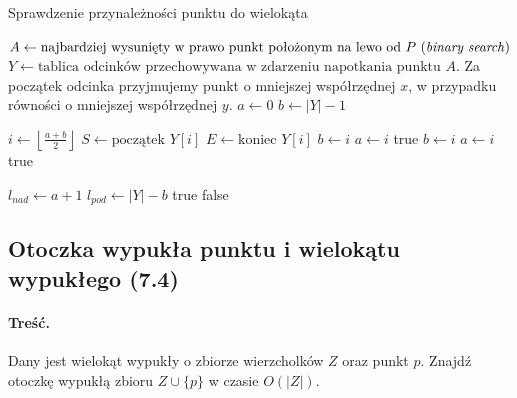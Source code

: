 \begin{algorithm}[H]
	\caption{Sprawdzenie przynależności punktu do wielokąta}
	\begin{algorithmic}[1]
			\State $A \gets \text{najbardziej wysunięty w prawo punkt położonym na lewo od $P$ (\textit{binary search})}$	
			\State $Y \gets \text{tablica odcinków przechowywana w zdarzeniu napotkania punktu $A$. }$Za początek odcinka przyjmujemy punkt o mniejszej współrzędnej $x$, w przypadku równości o mniejszej współrzędnej $y$.
			\State $a \gets 0$
			\State $b \gets |Y|-1$
			\State 
			
				\State $i \gets \left\lfloor \frac{a+b}{2} \right\rfloor$
				\State $S \gets \text{początek } Y[i]$ 
				\State $E \gets \text{koniec } Y[i]$ 
				 
					\State $b \gets i$
				 
					\State $a \gets i$
					 
						\State \Return true 
					 
						\State $b \gets i$
					 
						\State $a \gets i$
					\Else {}
						\State \Return true 
					\EndIf
				
				\EndIf    
			\EndWhile
			\State
			\State $l_{nad} \gets  a +1$
			\State $l_{pod} \gets |Y| - b$
				\State \Return true
			\EndIf
			\State
			\State \Return false
		\EndProcedure
	\end{algorithmic}
	\label{alg:Zadanie7_1}
\end{algorithm}

\subsection{Otoczka wypukła punktu i wielokątu wypukłego (7.4)}
\paragraph{Treść.} Dany jest wielokąt wypukły o zbiorze wierzcholków $Z$ oraz punkt $p$. Znajdź otoczkę wypukłą zbioru $Z \cup \{p\}$ w czasie $O(|Z|)$.
